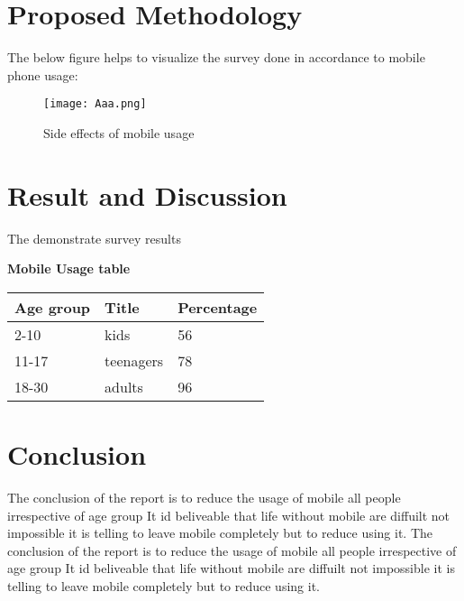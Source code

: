\documentclass{article}
\begin{document}
	\section{Proposed Methodology}
	The below figure helps to visualize the survey done in accordance to mobile phone usage: 
	\begin{figure}[h]
		\centering
		\texttt{[image: Aaa.png]}
		\caption{Side effects of mobile usage}
		\label{fig:mobile}
	\end{figure}
	
	\section{Result and Discussion}
	The demonstrate survey results
	\begin{center}
		\textbf{Mobile Usage table}
	\end{center}
	
	
	\begin{center}
		\begin{tabular}{|l|l|l|}
			\hline 
			Age group & Title & Percentage\\ \hline
			\hline 
			2-10 &  kids & 56\\ 
			\hline 
			11-17 & teenagers & 78  \\ 
			\hline 
			18-30 & adults & 96  \\ 
			\hline 
		\end{tabular}
	\end{center}
	
	\section{Conclusion}
	The conclusion of the report is to reduce the usage of mobile all people irrespective of age group It id beliveable that life without mobile are diffuilt not impossible it is telling to leave mobile completely but to reduce using it. The conclusion of the report is to reduce the usage of mobile all people irrespective of age group It id beliveable that life without mobile are diffuilt not impossible it is telling to leave mobile completely but to reduce using it. 
	
	
	
\end{document}
